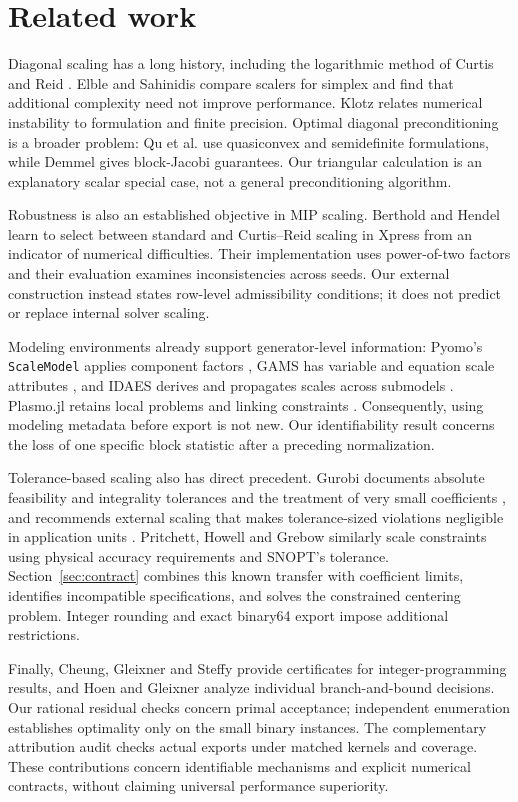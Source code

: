 \section{Related work}
\label{sec:related}
Diagonal scaling has a long history, including the logarithmic method of Curtis and
Reid \cite{curtis1972scaling}. Elble and Sahinidis \cite{elble2012scaling} compare
scalers for simplex and find that additional complexity need not improve performance.
Klotz \cite{klotz2014numerics} relates numerical instability to formulation and finite
precision. Optimal diagonal preconditioning is a broader problem: Qu et al.
\cite{qu2024diagonal} use quasiconvex and semidefinite formulations, while Demmel
\cite{demmel2023block} gives block-Jacobi guarantees. Our triangular calculation is
an explanatory scalar special case, not a general preconditioning algorithm.

Robustness is also an established objective in MIP scaling. Berthold and Hendel
\cite{berthold2021scaling} learn to select between standard and Curtis--Reid scaling
in Xpress from an indicator of numerical difficulties. Their implementation uses
power-of-two factors and their evaluation examines inconsistencies across seeds.
Our external construction instead states row-level admissibility conditions; it does
not predict or replace internal solver scaling.

Modeling environments already support generator-level information: Pyomo's
\texttt{ScaleModel} applies component factors \cite{pyomoScaleModel}, GAMS has
variable and equation scale attributes \cite{gamsScaling}, and IDAES derives and
propagates scales across submodels \cite{idaesScaling,idaesCustomScaler}. Plasmo.jl
retains local problems and linking constraints \cite{jalving2022plasmo}. Consequently,
using modeling metadata before export is not new. Our identifiability result concerns
the loss of one specific block statistic after a preceding normalization.

Tolerance-based scaling also has direct precedent. Gurobi documents absolute
feasibility and integrality tolerances and the treatment of very small coefficients
\cite{gurobiScaling}, and recommends external scaling that makes tolerance-sized
violations negligible in application units \cite{gurobiExternalScaling}. Pritchett,
Howell and Grebow \cite{pritchett2017scaling} similarly scale constraints using
physical accuracy requirements and SNOPT's tolerance. Section~\ref{sec:contract}
combines this known transfer with coefficient limits, identifies incompatible
specifications, and solves the constrained centering problem. Integer rounding and
exact binary64 export impose additional restrictions.

Finally, Cheung, Gleixner and Steffy \cite{cheung2017certificates} provide certificates
for integer-programming results, and Hoen and Gleixner \cite{hoen2024correctness}
analyze individual branch-and-bound decisions. Our rational residual checks concern
primal acceptance; independent enumeration establishes optimality only on the small
binary instances. The complementary attribution audit checks actual exports under
matched kernels and coverage. These contributions concern identifiable mechanisms
and explicit numerical contracts, without claiming universal performance superiority.
